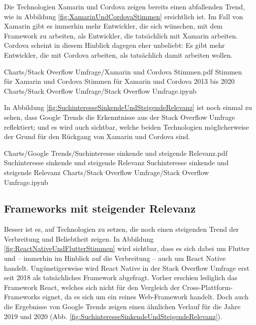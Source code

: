 Die Technologien Xamarin und Cordova zeigen bereits einen abfallenden Trend, wie in Abbildung \ref{fig:XamarinUndCordovaStimmen} ersichtlich ist.
Im Fall von Xamarin gibt es immerhin mehr Entwickler, die sich wünschen, mit dem Framework zu arbeiten, als Entwickler, die tatsächlich mit Xamarin arbeiten.
Cordova scheint in diesem Hinblick dagegen eher unbeliebt: Es gibt mehr Entwickler, die mit Cordova arbeiten, als tatsächlich damit arbeiten wollen.

\begin{alexfigurewithnotebook}{Charts/Stack Overflow Umfrage/Xamarin und Cordova Stimmen.pdf}
	{Stimmen für Xamarin und Cordova}
	{Stimmen für Xamarin und Cordova 2013 bis 2020}
	{Charts/Stack Overflow Umfrage/Stack Overflow Umfrage.ipynb}
	{}
	\label{fig:XamarinUndCordovaStimmen}

\end{alexfigurewithnotebook}


In Abbildung \ref{fig:SuchinteresseSinkendeUndSteigendeRelevanz} ist noch einmal zu sehen, dass Google Trends die Erkenntnisse aus der Stack Overflow Umfrage reflektiert; und es wird auch sichtbar, welche beiden Technologien möglicherweise der Grund für den Rückgang von Xamarin und Cordova sind.

\begin{alexfigurewithnotebook}{Charts/Google Trends/Suchinteresse sinkende und steigende Relevanz.pdf}
	{Suchinteresse sinkende und steigende Relevanz}
	{Suchinteresse sinkende und steigende Relevanz}
	{Charts/Stack Overflow Umfrage/Stack Overflow Umfrage.ipynb}
	{}
	\label{fig:SuchinteresseSinkendeUndSteigendeRelevanz}

\end{alexfigurewithnotebook}

\subsection{Frameworks mit steigender Relevanz}

Besser ist es, auf Technologien zu setzen, die noch einen steigenden Trend der Verbreitung und Beliebtheit zeigen.
In Abbildung \ref{fig:ReactNativeUndFlutterStimmen} wird sichtbar, dass es sich dabei um Flutter und -- immerhin im Hinblick auf die Verbreitung -- auch um React Native handelt.
Ungünstigerweise wird React Native in der Stack Overflow Umfrage erst seit 2018 als tatsächliches Framework abgefragt.
Vorher erschien lediglich das Framework React, welches sich nicht für den Vergleich der Cross-Plattform-Frameworks eignet, da es sich um ein reines Web-Framework handelt.
Doch auch die Ergebnisse von Google Trends zeigen einen ähnlichen Verlauf für die Jahre 2019 und 2020 (Abb. \ref{fig:SuchinteresseSinkendeUndSteigendeRelevanz}).

